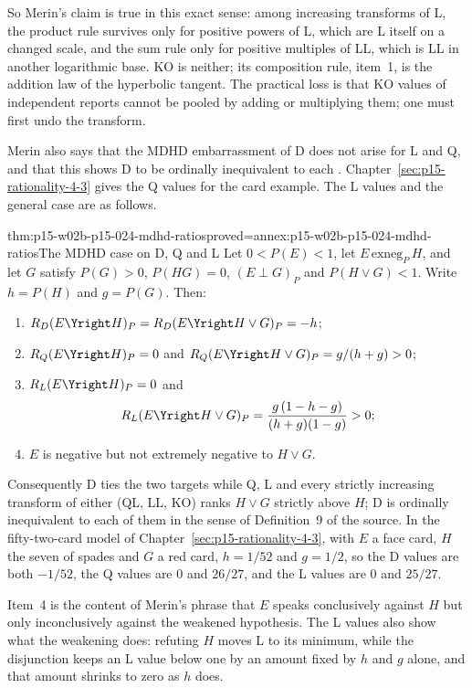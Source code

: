 So Merin's claim is true in this exact sense: among increasing
transforms of L, the product rule survives only for positive powers of
L, which are L itself on a changed scale, and the sum rule only for
positive multiples of LL, which is LL in another logarithmic base. KO
is neither; its composition rule, item~1, is the addition law of the
hyperbolic tangent. The practical loss is that KO values of
independent reports cannot be pooled by adding or multiplying them; one
must first undo the transform.

Merin also says that the MDHD embarrassment of D does not arise for L
and Q, and that this shows D to be ordinally inequivalent to each
\cite[p.~271]{Merin2021Relevance}. Chapter~\ref{sec:p15-rationality-4-3}
gives the Q values for the card example. The L values and the general
case are as follows.

\begin{hbtheorem}{thm:p15-w02b-p15-024-mdhd-ratios}{proved=annex:p15-w02b-p15-024-mdhd-ratios}{The MDHD case on D, Q and L}
Let \(0<P(E)<1\), let \(E\,\mathrm{exneg}_P\,H\), and let \(G\) satisfy
\(P(G)>0\), \(P(HG)=0\), \((E\perp G)_P\) and \(P(H\vee G)<1\). Write
\(h=P(H)\) and \(g=P(G)\). Then:
\begin{enumerate}
\item \(R_D(E\Yright H)_P=R_D(E\Yright H\vee G)_P=-h\);
\item \(R_Q(E\Yright H)_P=0\) and \(R_Q(E\Yright H\vee G)_P=g/(h+g)>0\);
\item \(R_L(E\Yright H)_P=0\) and
  \[
   R_L(E\Yright H\vee G)_P=\frac{g\,(1-h-g)}{(h+g)(1-g)}>0;
  \]
\item \(E\) is negative but not extremely negative to \(H\vee G\).
\end{enumerate}
Consequently D ties the two targets while Q, L and every strictly
increasing transform of either (QL, LL, KO) ranks \(H\vee G\) strictly
above \(H\); D is ordinally inequivalent to each of them in the sense
of Definition~9 of the source. In the fifty-two-card model of
Chapter~\ref{sec:p15-rationality-4-3}, with \(E\) a face card, \(H\)
the seven of spades and \(G\) a red card, \(h=1/52\) and \(g=1/2\), so
the D values are both \(-1/52\), the Q values are \(0\) and \(26/27\),
and the L values are \(0\) and \(25/27\).
\end{hbtheorem}

Item~4 is the content of Merin's phrase that \(E\) speaks conclusively
against \(H\) but only inconclusively against the weakened hypothesis.
The L values also show what the weakening does: refuting \(H\) moves L
to its minimum, while the disjunction keeps an L value below one by an
amount fixed by \(h\) and \(g\) alone, and that amount shrinks to zero
as \(h\) does.

